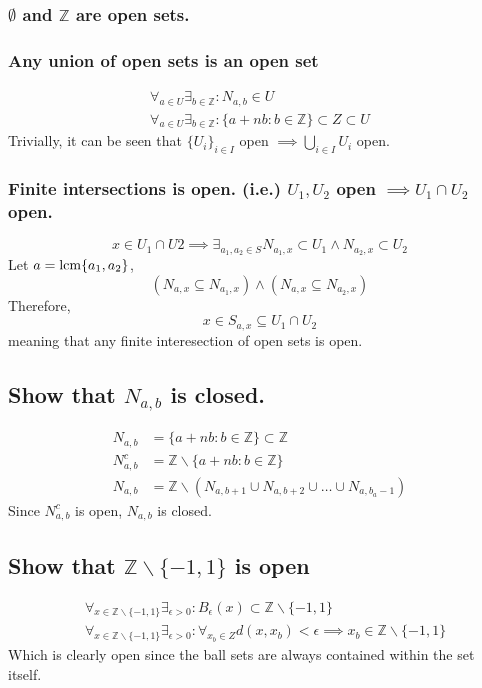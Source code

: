 \documentclass[]{article}
\newcommand{\Z}{\mathbb{Z}}
\begin{document}
\subsubsection{$\emptyset$ and $\Z$ are open sets.}
\subsubsection{Any union of open sets is an open set}
\begin{align*}
    \forall_{a\in U} \exists_{b\in\Z} : N_{a,b} \in U\\
    \forall_{a\in U} \exists_{b\in\Z} : \{a + nb : b \in \Z\} \subset Z \subset U
\end{align*}
Trivially, it can be seen that $\{U_i\}_{i\in I}$ open $\implies \bigcup_{i\in I} U_i$ open.
\subsubsection{Finite intersections is open. (i.e.) $U_1, U_2$ open $\implies U_1 \cap U_2$ open.}
$$x \in U_1 \cap U2 \implies \exists_{a_1,a_2\in S} N_{a_1,x} \subset U_1 \land N_{a_2,x} \subset U_2$$
Let $a = \text{lcm}\qty{a_1,a_2}$,
$$(N_{a,x} \subseteq N_{a_1,x}) \land (N_{a,x} \subseteq N_{a_2,x})$$
Therefore,
$$x\in S_{a,x} \subseteq U_1 \cap U_2$$
meaning that any finite interesection of open sets is open.

\subsection{Show that $N_{a,b}$ is closed.}
\begin{align*}
    N_{a,b} &= \{a + nb : b \in \Z\} \subset \Z\\
    N_{a,b}^c &= \Z \backslash \{a + nb : b \in \Z\}\\
    N_{a,b} &= \Z \backslash (N_{a,b+1} \cup N_{a,b+2} \cup \dots \cup N_{a,b_a-1})
\end{align*}
Since $N_{a,b}^c$ is open, $N_{a,b}$ is closed.


\subsection{Show that $\Z \backslash \{-1,1\}$ is open}
\begin{align*}
    &\forall_{x \in \Z \backslash \{-1,1\}} \exists_{\epsilon > 0} : 
        B_\epsilon(x) \subset \Z \backslash \{-1,1\}\\
    &\forall_{x \in \Z \backslash \{-1,1\}} \exists_{\epsilon > 0} : 
        \forall_{x_b \in Z} d(x,x_b) < \epsilon \implies x_b \in \Z \backslash \{-1,1\}
\end{align*}
Which is clearly open since the ball sets are always contained within the set itself.
\end{document}
